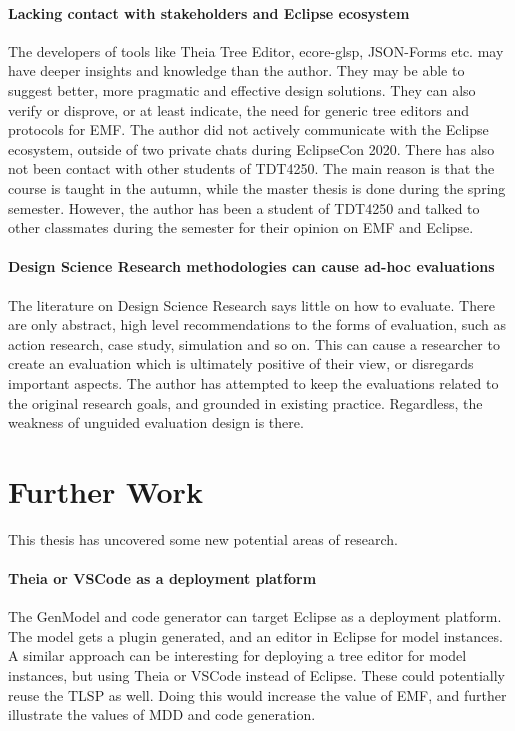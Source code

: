 \paragraph{Lacking contact with stakeholders and Eclipse ecosystem}
The developers of tools like Theia Tree Editor, ecore-glsp, JSON-Forms etc. may have deeper insights and knowledge than the author.
They may be able to suggest better, more pragmatic and effective design solutions.
They can also verify or disprove, or at least indicate, the need for generic tree editors and protocols for \acrshort{EMF}.
The author did not actively communicate with the Eclipse ecosystem, outside of two private chats during EclipseCon 2020.
There has also not been contact with other students of \gls{TDT4250}.
The main reason is that the course is taught in the autumn, while the master thesis is done during the spring semester.
However, the author has been a student of \gls{TDT4250} and talked to other classmates during the semester for their opinion on \acrshort{EMF} and \gls{Eclipse}.

\paragraph{Design Science Research methodologies can cause ad-hoc evaluations}
The literature on Design Science Research says little on how to evaluate.
There are only abstract, high level recommendations to the forms of evaluation, such as action research, case study, simulation and so on.
This can cause a researcher to create an evaluation which is ultimately positive of their view, or disregards important aspects.
The author has attempted to keep the evaluations related to the original research goals, and grounded in existing practice.
Regardless, the weakness of unguided evaluation design is there.


\section{Further Work}

This thesis has uncovered some new potential areas of research.

\paragraph{Theia or VSCode as a deployment platform}
The GenModel and code generator can target \gls{Eclipse} as a deployment platform.
The model gets a plugin generated, and an editor in \gls{Eclipse} for model instances.
A similar approach can be interesting for deploying a tree editor for model instances, but using \gls{Theia} or \gls{VSCode} instead of \gls{Eclipse}.
These could potentially reuse the \acrshort{TLSP} as well.
Doing this would increase the value of \acrshort{EMF}, and further illustrate the values of \acrlong{MDD} and code generation.

